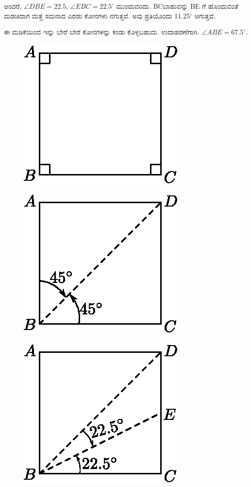\smallskip
ಅಂದರೆ, $\angle DBE = 22.5$, $\angle EBC = 22.5^\circ$ ಮುಂದುವರಿದು. BC\break ಬಾಹುವನ್ನು BE ಗೆ ಹೊಂದುವಂತೆ ಮಡಚಿದಾಗ ಮತ್ತೆ ಸಮನಾದ ಎರಡು ಕೋನಗಳು ನಗುತ್ತವೆ. ಅವು ಪ್ರತಿಯೊಂದು 11.25$^\circ$ ಆಗುತ್ತವೆ. 

\smallskip
ಈ ಮಡಿಕೆಯಿಂದ ಇನ್ನು ಬೇರೆ ಬೇರೆ ಕೋನಗಳನ್ನು ಕಂಡು ಕೊಳ್ಳಬಹುದು. ಉದಾ\break ಹರಣೆಗಾಗಿ.  $\angle ABE = 67.5^\circ$.
\begin{figure}[H]
\centering
\includegraphics[scale=.98]{src/figure/chap1/fig1-7a.eps}
\end{figure}
\begin{figure}[H]
\centering
\includegraphics[scale=.98]{src/figure/chap1/fig1-7b.eps}
\end{figure}
\begin{figure}[H]
\centering
\includegraphics[scale=.98]{src/figure/chap1/fig1-7c.eps}
\end{figure}
